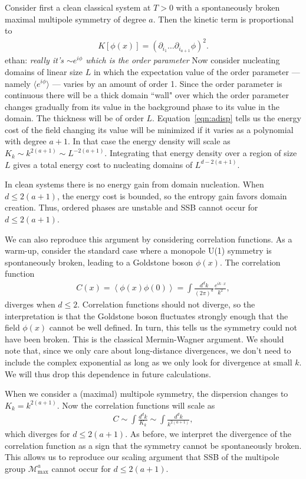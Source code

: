 \documentclass[pra,aps,twocolumn, amsfonts,amsmath,amssymb,nofootinbib,superscriptaddress]{revtex4-2}
\renewcommand{\max}{\text{max}}
\newcommand{\ethan}[1]{ { \color{blue} \footnotesize \textsf{ethan: \textsl{#1}} }}
\begin{document}
Consider first a clean classical system at $T>0$ with a spontaneously broken maximal multipole symmetry of degree $a$.
Then the kinetic term is proportional to 
\begin{align}
K[\phi(x)] = (\partial_{i_1} \dots \partial_{i_{a+1}} \phi)^2. \label{eqn:adisp}
\end{align} 
 \ethan{really it's $\sim e^{i\phi}$ which is the order parameter}
Now consider nucleating domains of linear size $L$ in which the expectation value of the order parameter --- namely $\langle e^{i\phi}\rangle$ --- varies by an amount of order 1. Since the order parameter is continuous there will be a thick domain ``wall" over which the order parameter changes gradually from its value in the background phase to its value in the domain. The thickness will be of order $L$.
Equation~\ref{eqn:adisp} tells us the  energy cost of the field changing its value will be minimized if it varies as a polynomial with degree $a+1$. In that case the energy density will scale as $K_k \sim k^{2(a+1)} \sim L^{-2(a+1)}$. Integrating that energy density over a region of size $L$ gives a total energy cost to nucleating domains of $L^{d-2(a+1)}$.

In clean systems there is no energy gain from domain nucleation. When $d\le2(a+1)$, the energy cost is bounded, so the entropy gain favors domain creation. Thus, ordered phases are unstable and SSB cannot occur for $d\le2(a+1)$.

We can also reproduce this argument by considering correlation functions. As a warm-up, consider the standard case where a monopole U(1) symmetry is spontaneously broken, leading to a Goldstone boson $\phi(x)$. The correlation function
\begin{align}
C(x) = \left\langle \phi(x) \phi(0) \right\rangle = \int \frac{d^dk}{(2\pi)^d} \frac{e^{i k \cdot x}}{k^2}, 
\end{align}
diverges when $d\le 2$. Correlation functions should not diverge, so the interpretation is that the Goldstone boson fluctuates strongly enough that the field $\phi(x)$ cannot be well defined. In turn, this tells us the symmetry could not have been broken. This is the classical Mermin-Wagner argument. We should note that, since we only care about long-distance divergences, we don't need to include the complex exponential as long as we only look for divergence at small $k$. We will thus drop this dependence in future calculations. 

When we consider a (maximal) multipole symmetry, the dispersion changes to $K_k=k^{2(a+1)}$. Now the correlation functions will scale as 
\begin{align}
C \sim \int \frac{d^dk}{K_k} \sim \int \frac{d^dk}{k^{2(a+1)}}, \label{eqn:correl}
\end{align}
which diverges for $d\le2(a+1)$. As before, we interpret the divergence of the correlation function as a sign that the symmetry cannot be spontaneously broken. This allows us to reproduce our scaling argument that SSB of the multipole group $\mathcal{M}^a_\max$ cannot occur for $d\le2(a+1)$.
\end{document}
